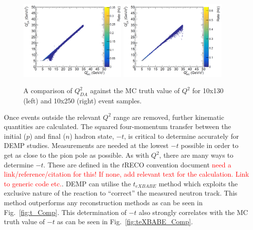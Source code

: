 \documentclass[letterpaper,12pt]{article}
\begin{document}
\begin{figure}[h]
    \centering
    \includegraphics[width=0.475\textwidth]{Figures/10on130_Q2DAComp.png}
    \includegraphics[width=0.475\textwidth]{Figures/10on250_Q2DAComp.png}
    \caption{A comparison of $Q^{2}_{DA}$ against the MC truth value of $Q^{2}$ for 10x130 (left) and 10x250 (right) event samples.}
\label{fig:Q2DA_Comp}
\end{figure}

Once events outside the relevant $Q^{2}$ range are removed, further kinematic quantities are calculated. The squared four-momentum transfer between the initial ($p$) and final ($n$) hadron state, $-t$, is critical to determine accurately for DEMP studies. Measurements are needed at the lowest $-t$ possible in order to get as close to the pion pole as possible. As with $Q^{2}$, there are many ways to determine $-t$. These are defined in the $t$RECO convention document \textcolor{red}{need a link/reference/citation for this! If none, add relevant text for the calculation. Link to generic code etc.}. DEMP can utilise the $t_{eXBABE}$ method which exploits the exclusive nature of the reaction to ``correct'' the measured neutron track. This method outperforms any reconstruction methods as can be seen in Fig.~\ref{fig:t_Comp}. This determination of $-t$ also strongly correlates with the MC truth value of $-t$ as can be seen in Fig.~\ref{fig:teXBABE_Comp}.
\end{document}
